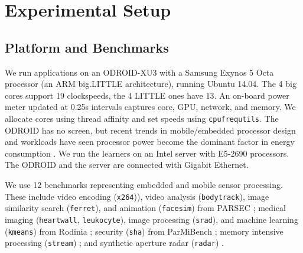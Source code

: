 \section{Experimental Setup}

\subsection{Platform and Benchmarks}
We run applications on an ODROID-XU3 with a Samsung Exynos 5 Octa
processor (an ARM big.LITTLE architecture), running Ubuntu 14.04. The
4 big cores support 19 clockspeeds, the 4 LITTLE ones have 13.  An
on-board power meter updated at 0.25s intervals captures core, GPU,
network, and memory. We allocate cores using thread affinity and set
speeds using \texttt{cpufrequtils}.  The ODROID has no screen, but
recent trends in mobile/embedded processor design and workloads have
seen processor power become the dominant factor in energy consumption
\cite{HPCA2016}.  We run the learners on an Intel server with E5-2690
processors.  The ODROID and the server are connected with Gigabit
Ethernet.

We use 12 benchmarks representing embedded and mobile sensor
processing.  These include video encoding (\texttt{x264})), video
analysis (\texttt{bodytrack}), image similarity search
(\texttt{ferret}), and animation (\texttt{facesim}) from PARSEC
\cite{parsec}; medical imaging (\texttt{heartwall},
\texttt{leukocyte}), image processing (\texttt{srad}), and machine
learning (\texttt{kmeans}) from Rodinia \cite{rodinia}; security
(\texttt{sha}) from ParMiBench \cite{parmibench}; memory intensive
processing (\texttt{stream}) \cite{stream}; and synthetic aperture
radar (\texttt{radar}) \cite{radar}.

